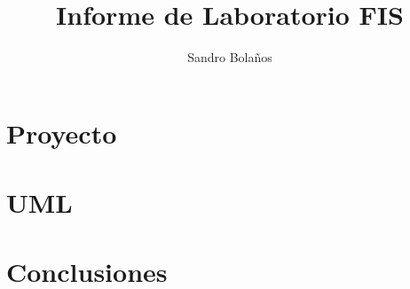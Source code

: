 \documentclass[11pt]{book}
\title{Informe de Laboratorio FIS}
\author{Sandro Bolaños}
\begin{document}
	\maketitle
	\tableofcontents
\part{Proyecto}



\part{UML}



\part{Conclusiones}





\end{document}
